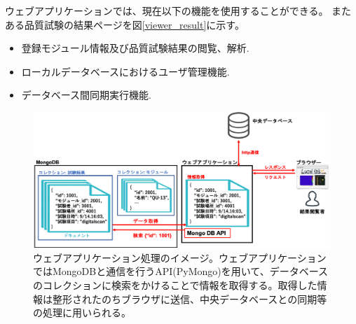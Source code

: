 ウェブアプリケーションでは、現在以下の機能を使用することができる。
またある品質試験の結果ページを図\ref{viewer_result}に示す。
\begin{itemize}
  \item 登録モジュール情報及び品質試験結果の閲覧、解析.
  \item ローカルデータベースにおけるユーザ管理機能.
  \item データベース間同期実行機能.
\end{itemize}

\begin{figure}[bpt]\centering
\includegraphics[width=16cm]{./webapp_process.png}
\caption[ウェブアプリケーション処理のイメージ]{ウェブアプリケーション処理のイメージ。ウェブアプリケーションではMongoDBと通信を行うAPI(PyMongo)を用いて、データベースのコレクションに検索をかけることで情報を取得する。取得した情報は整形されたのちブラウザに送信、中央データベースとの同期等の処理に用いられる。}
\label{webapp_process}
\end{figure}

